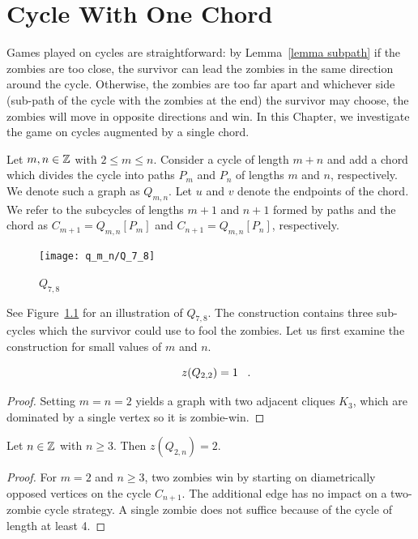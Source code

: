 \chapter{Cycle With One Chord}\label{chapter q_m_n}

Games played on cycles are straightforward: by Lemma~\ref{lemma subpath} if the zombies are too close, the survivor can lead the zombies in the same direction around the cycle. Otherwise, the zombies are too far apart and whichever side (sub-path of the cycle with the zombies at the end) the survivor may choose, the zombies will move in opposite directions and win. In this Chapter, we investigate the game on cycles augmented by a single chord.

\begin{definition}
 Let $m, n \in \mathbb{Z}$ with $2\leq m \leq n$. Consider a cycle of length $m+n$ and add a chord which
 divides the cycle into paths $P_m$ and $P_n$ of lengths $m$ and $n$, respectively.
 We denote such a graph as $Q_{m,n}$. Let $u$ and $v$ denote the endpoints of the chord. We refer to the subcycles of lengths $m+1$ and $n+1$ formed by paths and the chord as $C_{m+1} = Q_{m,n}[P_m]$ and $C_{n+1} = Q_{m,n}[P_n]$, respectively.
\end{definition}

\begin{figure}
  \centering
 \texttt{[image: q\_m\_n/Q\_7\_8]}
 \caption{$Q_{7,8}$ \label{fig:Q_7_8}}
\end{figure}

See Figure~\ref{fig:Q_7_8} for an illustration of $Q_{7,8}$.
The construction contains three sub-cycles which the survivor could use to fool the zombies.
Let us first examine the construction for small values of $m$ and $n$.

 \begin{lemma}
\[ z(Q_{2,2}) = 1 \mperiod \]
 \end{lemma}
\begin{proof}
  Setting $m=n=2$ yields a graph with two adjacent cliques $K_3$, which are dominated by a single vertex so it is zombie-win.
\end{proof}

\begin{lemma}
  Let $n \in \mathbb{Z}$ with $n \geq 3$. Then $z(Q_{2,n}) = 2$.
\end{lemma}
\begin{proof}
  For $m=2$ and $n\geq 3$, two zombies win by starting on diametrically
  opposed vertices on the cycle $C_{n+1}$. The additional edge has no impact on a two-zombie cycle strategy. A single zombie does not suffice because of the cycle of length at least 4.
\end{proof}

